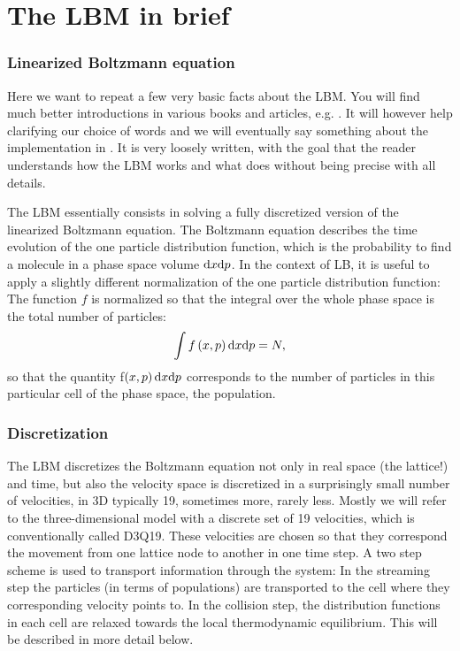 \chapter{The LBM in brief}

\subsection*{Linearized Boltzmann equation}

Here we want to repeat a few very basic facts about the LBM. 
You will find much better introductions in various books and
articles, e.g. \cite{succi, duenweg}. It will however help clarifying 
our choice of words and we will eventually say something about the 
implementation in \ES{}. It is very loosely written, with the goal that
the reader understands how the LBM works and what \ES{} does without
being precise with all details. 

The LBM essentially consists in solving a fully discretized
version of the linearized Boltzmann equation. The Boltzmann equation
describes the time evolution of the one particle distribution
function, which is the probability to find a molecule in a phase
space volume $\mathrm d x \mathrm d p$. In the context of
LB, it is useful to apply a slightly different normalization of
the one particle distribution function: The function $f$ is normalized
so that the integral over the whole phase space is the total 
number of particles:
\begin{equation*}
  \int f\left(x,p\right)\mathrm d x \mathrm d p = N,
\end{equation*}
so that the quantity f$\left(x,p\right)\mathrm d x \mathrm d p$ corresponds
to the number of particles in this particular cell of the phase
space, the population. \\

\subsection*{Discretization}

The LBM discretizes the Boltzmann equation not only in real
space (the lattice!) and time, but also the velocity space is discretized 
in a surprisingly small number of velocities, in 3D typically
19, sometimes more, rarely less. 
Mostly we will refer to the three-dimensional model with a discrete
set of 19 velocities, which is conventionally called D3Q19.
These velocities
are chosen so that they correspond the movement from one lattice
node to another in one time step. A two step scheme is used to transport
information through the system: In the streaming step
the particles (in terms of populations) are transported
to the cell where they corresponding velocity points to. 
In the collision step, the distribution functions
in each cell are relaxed towards the local thermodynamic
equilibrium. This will be described in more detail below.

